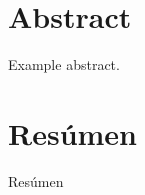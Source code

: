 \documentclass[12pt,a4paper,openright,oneside]{article}
\numberwithin{equation}{section}
\theoremstyle{definition}
\begin{document}
\newpage
{} 


\section*{Abstract}

Example abstract.

\section*{Resúmen}
Resúmen

\newpage 

\tableofcontents

\newpage

\setcounter{page}{1}




\end{document}
